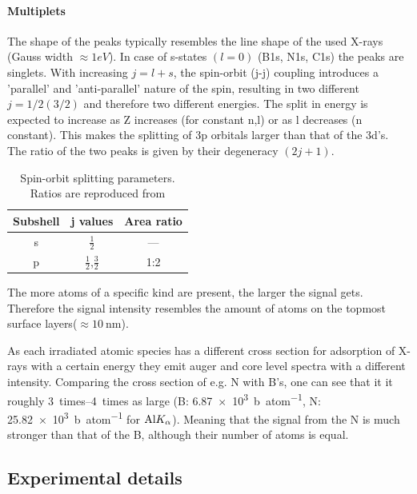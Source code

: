 \paragraph{Multiplets}
The shape of the peaks typically resembles the line shape of the used X-rays (Gauss width $\approx 1eV$). In case of s-states $(l=0)$ (B1s, N1s, C1s) the peaks are singlets. With increasing $j=l+s$, the spin-orbit (j-j) coupling introduces a 'parallel' and 'anti-parallel' nature of the spin, resulting in two different $j=1/2(3/2)$ and therefore two different energies. The split in energy is expected to increase as Z increases (for constant n,l) or as l decreases (n constant). This makes the splitting of 3p orbitals larger than that of the 3d's. The ratio of the two peaks is given by their degeneracy $(2j+1)$.\cite[113]{Riviere_90}
\begin{table}
\caption{Spin-orbit splitting parameters. Ratios are reproduced from \cite{Riviere_90}}
\centering
 \begin{tabular}{ccc}
 Subshell & j values & Area ratio \\ \hline
 s & $\frac{1}{2}$ & --- \\
 p & $\frac{1}{2}$,$\frac{3}{2}$ & 1:2 \\
 \end{tabular}
\end{table}

The more atoms of a specific kind are present, the larger the signal gets. Therefore the signal intensity resembles the amount of atoms on the topmost surface layers($\approx \SI{10}{\nm}$).

As each irradiated atomic species has a different cross section for adsorption of X-rays with a certain energy they emit auger and core level spectra with a different intensity. Comparing the cross section of e.g. N with B's, one can see that it it roughly \SIrange{3}{4}{times} as large (B: \SI{6,87e3}{\barn\per atom}, N: \SI{25,82e3}{\barn\per atom} for $\textnormal{Al} K_{\alpha}$)\cite{henke_x-ray_1993}. Meaning that the signal from the N is much stronger than that of the B, although their number of atoms is equal.

\subsection{Experimental details}
